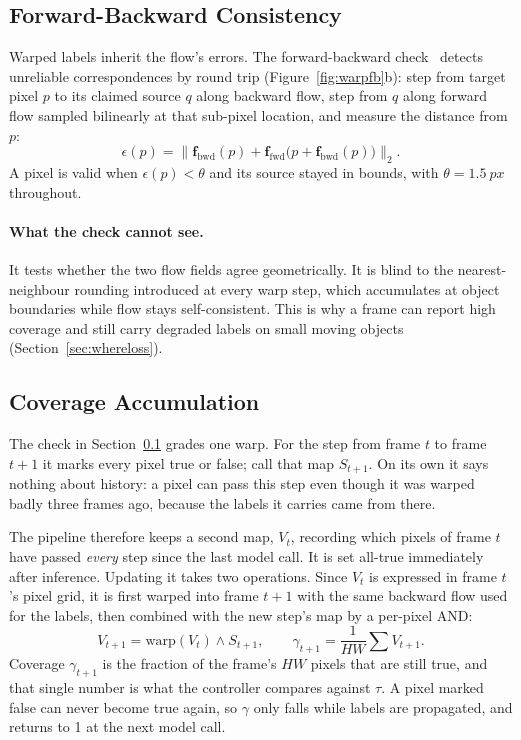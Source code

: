 \documentclass[report.tex]{subfiles}
\begin{document}
\subsection{Forward-Backward Consistency}
\label{sec:fb}

Warped labels inherit the flow's errors. The forward-backward
check~\cite{sundaram2010,brox2004} detects unreliable correspondences by round
trip (Figure~\ref{fig:warpfb}b): step from target pixel $p$ to its claimed
source $q$ along backward flow, step from $q$ along forward flow sampled
bilinearly at that sub-pixel location, and measure the distance from $p$:
%
\begin{equation}
    \epsilon(p) = \bigl\lVert \mathbf{f}_{\text{bwd}}(p) + \mathbf{f}_{\text{fwd}}\bigl(p + \mathbf{f}_{\text{bwd}}(p)\bigr) \bigr\rVert_2 .
    \label{eq:fb}
\end{equation}
%
A pixel is valid when $\epsilon(p) < \theta$ and its source stayed in bounds,
with $\theta = \SI{1.5}{px}$ throughout.

\paragraph{What the check cannot see.} It tests whether the two flow fields
agree geometrically. It is blind to the nearest-neighbour rounding introduced
at every warp step, which accumulates at object boundaries while flow stays
self-consistent. This is why a frame can report high coverage and still carry
degraded labels on small moving objects (Section~\ref{sec:whereloss}).

\subsection{Coverage Accumulation}
\label{sec:coverage}

The check in Section~\ref{sec:fb} grades one warp. For the step from frame
$t$ to frame $t{+}1$ it marks every pixel true or false; call that map
$S_{t+1}$. On its own it says nothing about history: a pixel can pass this
step even though it was warped badly three frames ago, because the labels it
carries came from there.

The pipeline therefore keeps a second map, $V_t$, recording which pixels of
frame $t$ have passed \emph{every} step since the last model call. It is set
all-true immediately after inference. Updating it takes two operations. Since
$V_t$ is expressed in frame $t$'s pixel grid, it is first warped into frame
$t{+}1$ with the same backward flow used for the labels, then combined with
the new step's map by a per-pixel AND:
%
\begin{equation}
    V_{t+1} = \mathrm{warp}(V_t) \wedge S_{t+1},
    \qquad
    \gamma_{t+1} = \frac{1}{HW}\sum V_{t+1} .
    \label{eq:coverage}
\end{equation}
%
Coverage $\gamma_{t+1}$ is the fraction of the frame's $HW$ pixels that are
still true, and that single number is what the controller compares against
$\tau$. A pixel marked false can never become true again, so $\gamma$ only
falls while labels are propagated, and returns to 1 at the next model call.
\end{document}
